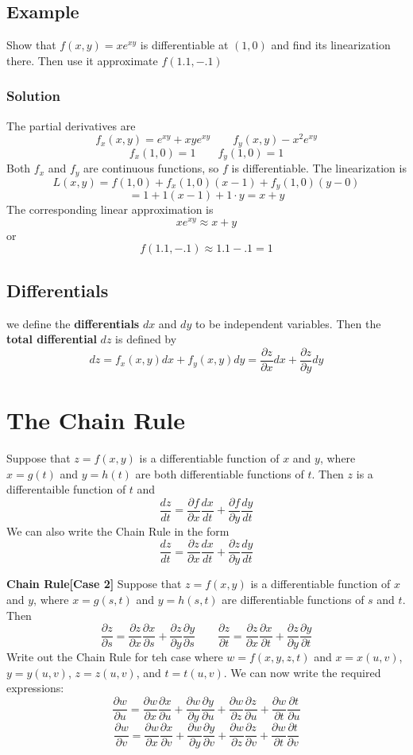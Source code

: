 \subsection*{Example}
Show that $f(x,y) = xe^{xy}$ is differentiable at $(1,0)$ and find its linearization there. Then use it approximate $f(1.1,-.1)$
\subsubsection*{Solution}
The partial derivatives are $$f_x(x,y) = e^{xy} + xye^{xy}\qquad f_y(x,y) - x^2e^{xy}$$
$$f_x(1,0) = 1\qquad f_y(1,0) = 1$$ Both $f_x$ and $f_y$ are continuous functions, so $f$ is differentiable. The linearization is 
$$L(x,y) = f(1,0) + f_x(1,0)(x-1) + f_y(1,0)(y-0)$$ $$= 1 + 1(x-1) + 1\cdot y = x + y$$
The corresponding linear approximation is $$xe^{xy}\approx x + y$$ or $$f(1.1, -.1)\approx 1.1 - .1 = 1$$
\subsection*{Differentials}
we define the \textbf{differentials} $dx$ and $dy$ to be independent variables. Then the \textbf{total differential} $dz$ is defined by
$$dz = f_x(x,y)dx + f_y(x,y)dy = \frac{\partial z}{\partial x}dx + \frac{\partial z}{\partial y}dy$$

\section{The Chain Rule}
Suppose that $z = f(x,y)$ is a differentiable function of $x$ and $y$, where $x = g(t)$ and $y = h(t)$ are both differentiable functions of $t$. Then $z$ is a differentaible function of $t$ and
$$\frac{dz}{dt} = \frac{\partial f }{\partial x}\frac{dx}{dt} + \frac{\partial f}{\partial y}\frac{dy}{dt}$$
We can also write the Chain Rule in the form $$\frac{dz}{dt} = \frac{\partial z}{\partial x}\frac{dx}{dt} + \frac{\partial z}{\partial y}\frac{dy}{dt}$$

\textbf{Chain Rule[Case 2]} Suppose that $z = f(x,y)$ is a differentiable function of $x$ and $y$, where $x = g(s,t)$ and $y = h(s,t)$ are differentiable functions of $s$ and $t$. Then
$$\frac{\partial z}{\partial s} = \frac{\partial z}{\partial x}\frac{\partial x}{\partial s} + \frac{\partial z}{\partial y}\frac{\partial y}{\partial s}\qquad \frac{\partial z}{\partial t} = \frac{\partial z}{\partial x}\frac{\partial x}{\partial t} + \frac{\partial z}{\partial y}\frac{\partial y}{\partial t}$$
Write out the Chain Rule for teh case where $w = f(x,y,z,t)$ and $x = x(u,v)$, $y = y(u,v)$, $z = z(u,v)$, and $t = t(u,v)$.
We can now write the required expressions: 
$$\frac{\partial w}{\partial u} = \frac{\partial w}{\partial x}\frac{\partial x}{\partial u} + \frac{\partial w}{\partial y}\frac{\partial y}{\partial u} + \frac{\partial w}{\partial z}\frac{\partial z}{\partial u} + \frac{\partial w}{\partial t}\frac{\partial t}{\partial u}$$
$$\frac{\partial w}{\partial v} = \frac{\partial w}{\partial x}\frac{\partial x}{\partial v} + \frac{\partial w}{\partial y}\frac{\partial y}{\partial v} + \frac{\partial w}{\partial z}\frac{\partial z}{\partial v} + \frac{\partial w}{\partial t}\frac{\partial t}{\partial v}$$
